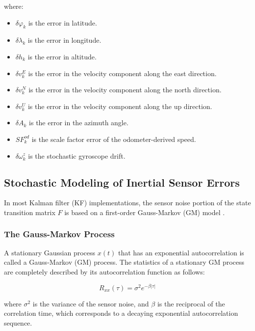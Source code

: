 \documentclass[conference]{IEEEtran}
\begin{document}
where:

\begin{itemize}
    \item $\delta \varphi_k$ \quad is the error in latitude.
    \item $\delta \lambda_k$ \quad is the error in longitude.
    \item $\delta h_k$ \quad is the error in altitude.
    \item $\delta v_k^E$ \quad is the error in the velocity component along the east direction.
    \item $\delta v_k^N$ \quad is the error in the velocity component along the north direction.
    \item $\delta v_k^U$ \quad is the error in the velocity component along the up direction.
    \item $\delta A_k$ \quad is the error in the azimuth angle.
    \item $SF_k^{od}$ \quad is the scale factor error of the odometer-derived speed.
    \item $\delta \omega_k^z$ \quad is the stochastic gyroscope drift.
\end{itemize}

\subsection{Stochastic Modeling of Inertial Sensor Errors}

In most Kalman filter (KF) implementations, the sensor noise portion of the state transition matrix $F$ is based on a first-order Gauss-Markov (GM) model \cite{iqbal2009}. 

\subsubsection{The Gauss-Markov Process}

A stationary Gaussian process $x(t)$ that has an exponential autocorrelation is called a Gauss-Markov (GM) process. The statistics of a stationary GM process are completely described by its autocorrelation function as follows:

\begin{equation}
    R_{xx}(\tau) = \sigma^2 e^{-\beta |\tau|}
\end{equation}

where $\sigma^2$ is the variance of the sensor noise, and $\beta$ is the reciprocal of the correlation time, which corresponds to a decaying exponential autocorrelation sequence.
\end{document}
